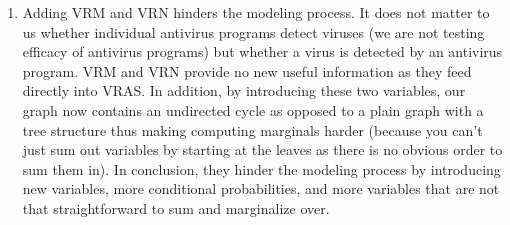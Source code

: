 \documentclass[12pt,letterpaper]{article}
\begin{document}
\begin{enumerate}[label={(\alph*) }]
 \item

Adding VRM and VRN hinders the modeling process. It does not matter to us whether individual antivirus programs detect viruses (we are not testing efficacy of antivirus programs) but whether a virus is detected by an antivirus program. VRM and VRN provide no new useful information as they feed directly into VRAS. In addition, by introducing these two variables, our graph now contains an undirected cycle as opposed to a plain graph with a tree structure  thus making  computing marginals harder (because you can't just sum out variables by starting at the leaves as there is no obvious order to sum them in). In conclusion, they hinder the modeling process by introducing new variables, more conditional probabilities, and more variables that are not that straightforward to sum and marginalize over. \\
\end{enumerate}
\end{document}
